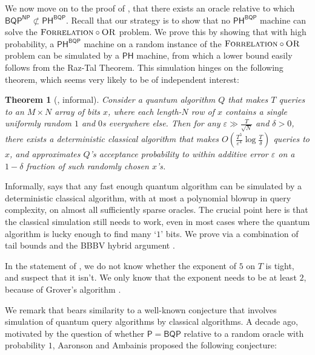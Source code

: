 \documentclass[11pt]{article}%
\newtheorem{theorem}{Theorem}
\newcommand{\eps}{\varepsilon}
\newcommand{\OR}{\normalfont\textsc{OR}}
\newcommand{\Forrelation}{\normalfont\textsc{Forrelation}}
\begin{document}
\bigskip

We now move on to the proof of , that there exists an oracle relative to which $\mathsf{BQP}^\mathsf{NP} \not\subset \mathsf{PH}^\mathsf{BQP}$. Recall that our strategy is to show that no $\mathsf{PH}^\mathsf{BQP}$ machine can solve the $\Forrelation \circ \OR$ problem. We prove this by showing that with high probability, a $\mathsf{PH}^\mathsf{BQP}$ machine on a random instance of the $\Forrelation \circ \OR$ problem can be simulated by a $\mathsf{PH}$ machine, from which a lower bound easily follows from the Raz-Tal Theorem. This simulation hinges on the following theorem, which seems very likely to be of independent interest:

\begin{theorem}[, informal]
\label{thm:sparse_aa_intro}
Consider a quantum algorithm $Q$ that makes $T$ queries to an $M \times N$ array of bits $x$, where each length-$N$ row of $x$ contains a single uniformly random $1$ and $0$s everywhere else. Then for any $\eps \gg \frac{T}{\sqrt{N}}$ and $\delta > 0$, there exists a deterministic classical algorithm that makes $O\left(\frac{T^5}{\eps^4} \log \frac{T}{\delta}\right)$ queries to $x$, and approximates $Q$'s acceptance probability to within additive error $\eps$ on a $1 - \delta$ fraction of such randomly chosen $x$'s.
\end{theorem}

Informally,  says that any fast enough quantum algorithm can be simulated by a deterministic classical algorithm, with at most a polynomial blowup in query complexity, on almost all sufficiently sparse oracles. The crucial point here is that the classical simulation still needs to work, even in most cases where the quantum algorithm is lucky enough to find many `$1$' bits.  We prove  via a combination of tail bounds and the BBBV hybrid argument \cite{BBBV97}.

In the statement of , we do not know whether the exponent of $5$ on $T$ is tight, and suspect that it isn't.  We only know that the exponent needs to be at least $2$, because of Grover's algorithm \cite{Gro96}.

We remark that  bears similarity to a well-known conjecture that involves simulation of quantum query algorithms by classical algorithms. A decade ago, motivated by the question of whether $\mathsf{P}=\mathsf{BQP}$ relative to a random oracle with probability $1$, Aaronson and Ambainis \cite{AA14} proposed the following conjecture:
\end{document}
